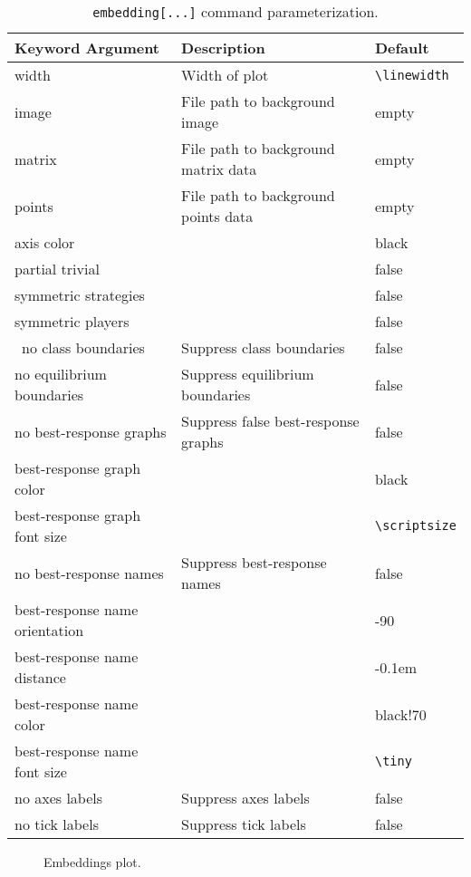 \documentclass[10pt]{article}
\begin{document}
\begin{table}[t]
    \centering
    \footnotesize
    \begin{tabular}{lll}
        Keyword Argument & Description & Default \\ \hline
        width & Width of plot & \verb!\linewidth! \\
        image & File path to background image & empty \\
        matrix & File path to background matrix data & empty \\
        points & File path to background points data & empty \\
        axis color & & black \\
        partial trivial & & false \\
        symmetric strategies & & false \\
        symmetric players & & false \\\
        no class boundaries & Suppress class boundaries & false\\
        no equilibrium boundaries & Suppress equilibrium boundaries & false\\
        no best-response graphs & Suppress false best-response graphs & false \\
        best-response graph color & & black\\
        best-response graph font size & & \verb!\scriptsize! \\
        no best-response names & Suppress best-response names & false \\
        best-response name orientation & & -90 \\
        best-response name distance & & -0.1em \\
        best-response name color & & black!70 \\
        best-response name font size & & \verb!\tiny! \\
        no axes labels & Suppress axes labels & false \\
        no tick labels & Suppress tick labels & false \\
    \end{tabular}
    \cprotect\caption{\verb!embedding[...]! command parameterization.}
    \label{tab:embedding_command_args}
\end{table}

\begin{figure}[t]
    \caption{Embeddings plot.}
\end{figure}
\end{document}
